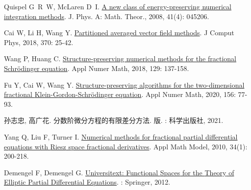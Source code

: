 \begin{thebibliography}{79}
    Quispel G~R~W, McLaren D~I.
    \newblock \href{https://iopscience.iop.org/article/10.1088/1751-8113/41/4/045206}{A new class of energy-preserving numerical integration methods}\allowbreak[J].
    \newblock J. Phys. A: Math. Theor., 2008, 41\allowbreak (4): 045206.
    
    Cai W, Li H, Wang Y.
    \newblock \href{https://linkinghub.elsevier.com/retrieve/pii/S0021999118303012}{Partitioned averaged vector field methods}\allowbreak[J].
    \newblock J Comput Phys, 2018, 370: 25-42.
    
    Wang P, Huang C.
    \newblock \href{https://linkinghub.elsevier.com/retrieve/pii/S0168927418300709}{Structure-preserving numerical methods for the fractional {{Schr{\"o}dinger}} equation}\allowbreak[J].
    \newblock Appl Numer Math, 2018, 129: 137-158.
    
    Fu Y, Cai W, Wang Y.
    \newblock \href{https://www.sciencedirect.com/science/article/pii/S0168927420301264}{Structure-preserving algorithms for the two-dimensional fractional {{Klein-Gordon-Schr{\"o}dinger}} equation}\allowbreak[J].
    \newblock Appl Numer Math, 2020, 156: 77-93.
    
    {孙志忠}, {高广花}.
    \newblock 分数阶微分方程的有限差分方法\allowbreak[M].
     版.
    : {科学出版社}, 2021.
    
    Yang Q, Liu F, Turner I.
    \newblock \href{https://www.sciencedirect.com/science/article/pii/S0307904X09001127}{Numerical methods for fractional partial differential equations with {{Riesz}} space fractional derivatives}\allowbreak[J].
    \newblock Appl Math Model, 2010, 34\allowbreak (1): 200-218.
    
    Demengel F, Demengel G.
    \newblock \href{http://link.springer.com/10.1007/978-1-4471-2807-6}{Universitext: Functional {{Spaces}} for the {{Theory}} of {{Elliptic Partial Differential Equations}}}\allowbreak[M].
    : {Springer}, 2012.
    

\end{thebibliography}

